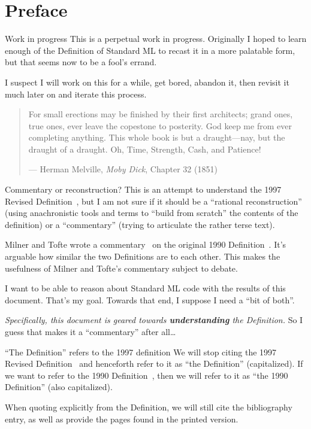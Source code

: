 \chapter{Preface}

\begin{remark}{Work in progress}
This is a perpetual work in progress. Originally I hoped to learn enough
of the Definition of Standard ML to recast it in a more palatable form,
but that seems now to be a fool's errand.

I suspect I will work on this for a while, get bored, abandon it, then
revisit it much later on and iterate this process.

\begin{quote}
For small erections may be finished by their first architects; grand
ones, true ones, ever leave the copestone to posterity. God keep me from
ever completing anything. This whole book is but a draught---nay, but
the draught of a draught. Oh, Time, Strength, Cash, and Patience!

--- Herman Melville, \textit{Moby Dick}, Chapter 32 (1851)
\end{quote}
\end{remark}

\begin{remark}{Commentary or reconstruction?}
This is an attempt to understand the 1997 Revised
Definition~\cite{milner1997definition}, but I am not sure if it should
be a ``rational reconstruction'' (using anachronistic tools and terms to
``build from scratch'' the contents of the definition) or a
``commentary'' (trying to articulate the rather terse text).

Milner and Tofte wrote a commentary~\cite{milner1991commentary} on the
original 1990 Definition~\cite{milner1990definition}.  It's arguable how
similar the two Definitions are to each other. This makes the usefulness
of Milner and Tofte's commentary subject to debate.

I want to be able to reason about Standard ML code with the results of
this document. That's my goal. Towards that end, I suppose I need a
``bit of both''.

\emph{Specifically, this document is geared towards \textbf{understanding}
the Definition.} So I guess that makes it a ``commentary'' after all\dots
\end{remark}

\begin{remark}{``The Definition'' refers to the 1997 definition}
We will stop citing the 1997 Revised
Definition~\cite{milner1997definition} and henceforth refer to it as
``the Definition'' (capitalized). If we want to refer to the 1990
Definition~\cite{milner1990definition}, then we will refer to it as
``the 1990 Definition'' (also capitalized).

When quoting explicitly from the Definition, we will still cite the
bibliography entry, as well as provide the pages found in the printed
version. 
\end{remark}

